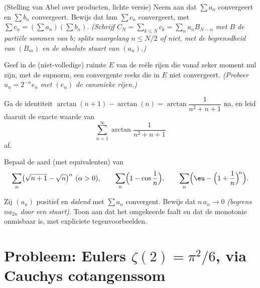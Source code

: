 \begin{exercise}[$\star\star\star$]\label{exo:b2:series:8}
(Stelling van Abel over producten, lichte versie) Neem aan dat
$\sum a_n$  convergeert en $\sum b_n$ convergeert. Bewijs
dat hun  $\sum c_n$ convergeert, met $\sum c_n =
(\sum a_n)(\sum b_n)$. \emph{(Schrijf $C_N = \sum_{k\leq N} c_k =
\sum_n a_n B_{N-n}$ met $B$ de partiële sommen van $b$; splits
naargelang $n \leq N/2$ of niet, met de begrensdheid van $(B_m)$ en
de absolute staart van $(a_n)$.)}
\end{exercise}

\begin{exercise}[$\star\star\star$]\label{exo:b2:series:9}
Geef in de (niet-volledige) ruimte $E$ van de reële rijen die vanaf
zeker moment nul zijn, met de supnorm, een  convergente
reeks die in $E$ niet convergeert. \emph{(Probeer $u_n = 2^{-n}
e_n$ met $(e_n)$ de canonieke rijen.)}
\end{exercise}

\begin{exercise}[$\star\star$]\label{exo:b2:series:10}
Ga de identiteit $\arctan(n+1) - \arctan(n) =
\arctan\dfrac{1}{n^2 + n + 1}$ na, en leid daaruit de exacte waarde
van
\[
\sum_{n=1}^{\infty} \arctan\frac{1}{n^2 + n + 1}
\]
af.
\end{exercise}

\begin{exercise}[$\star\star$]\label{exo:b2:series:11}
Bepaal de aard (met equivalenten) van
\[
\sum_n \bigl(\sqrt{n+1} - \sqrt n\bigr)^{\alpha}
\ (\alpha > 0), \qquad
\sum_n \Bigl(1 - \cos\frac1n\Bigr), \qquad
\sum_n \Bigl(\eu - \Bigl(1 + \frac1n\Bigr)^{\!n}\Bigr).
\]
\end{exercise}

\begin{exercise}[$\star\star\star$]\label{exo:b2:series:12}
Zij $(a_n)$ positief en \emph{dalend} met $\sum a_n$ convergent.
Bewijs dat $n\,a_n \to 0$ \emph{(begrens $n a_{2n}$ door een
staart)}. Toon aan dat het omgekeerde faalt en dat de monotonie
onmisbaar is, met expliciete tegenvoorbeelden.
\end{exercise}

\section{Probleem: Eulers $\zeta(2) = \pi^2/6$, via Cauchys
cotangenssom}


